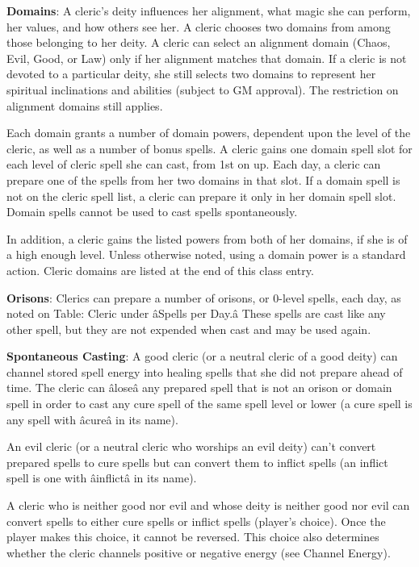 \textbf{Domains}: A cleric's deity influences her alignment, what magic she can perform, her values, and how others see her. A cleric chooses two domains from among those belonging to her deity. A cleric can select an alignment domain (Chaos, Evil, Good, or Law) only if her alignment matches that domain. If a cleric is not devoted to a particular deity, she still selects two domains to represent her spiritual inclinations and abilities (subject to GM approval). The restriction on alignment domains still applies.
				
Each domain grants a number of domain powers, dependent upon the level of the cleric, as well as a number of bonus spells. A cleric gains one domain spell slot for each level of cleric spell she can cast, from 1st on up. Each day, a cleric can prepare one of the spells from her two domains in that slot. If a domain spell is not on the cleric spell list, a cleric can prepare it only in her domain spell slot. Domain spells cannot be used to cast spells spontaneously. 
				
In addition, a cleric gains the listed powers from both of her domains, if she is of a high enough level. Unless otherwise noted, using a domain power is a standard action. Cleric domains are listed at the end of this class entry.
				
\textbf{Orisons}: Clerics can prepare a number of orisons, or 0-level spells, each day, as noted on Table: Cleric under \^aSpells per Day.\^a These spells are cast like any other spell, but they are not expended when cast and may be used again.
				
\textbf{Spontaneous Casting}: A good cleric (or a neutral cleric of a good deity) can channel stored spell energy into healing spells that she did not prepare ahead of time. The cleric can \^alose\^a any prepared spell that is not an orison or domain spell in order to cast any cure spell of the same spell level or lower (a cure spell is any spell with \^acure\^a in its name). 
				
An evil cleric (or a neutral cleric who worships an evil deity) can't convert prepared spells to cure spells but can convert them to inflict spells (an inflict spell is one with \^ainflict\^a in its name).
				
A cleric who is neither good nor evil and whose deity is neither good nor evil can convert spells to either cure spells or inflict spells (player's choice). Once the player makes this choice, it cannot be reversed. This choice also determines whether the cleric channels positive or negative energy (see Channel Energy).
				
